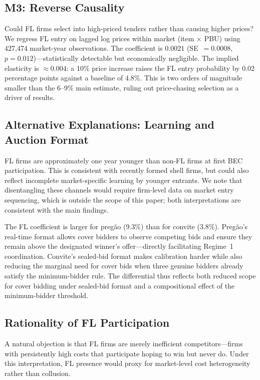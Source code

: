 \subsection{M3: Reverse Causality}

Could FL firms select into high-priced tenders rather than causing
higher prices? We regress FL entry on lagged log prices within market
(item $\times$ PBU) using 427,474 market-year observations. The
coefficient is $0.0021$ (SE~$=0.0008$, $p = 0.012$)---statistically
detectable but economically negligible. The implied elasticity is
$\approx 0.004$: a 10\% price increase raises the FL entry probability
by 0.02 percentage points against a baseline of 4.8\%. This is two
orders of magnitude smaller than the 6--9\% main estimate, ruling out
price-chasing selection as a driver of results.

\subsection{Alternative Explanations: Learning and Auction Format}

FL firms are approximately one year younger than non-FL firms at first %
BEC participation. This is consistent with recently formed shell firms,
but could also reflect incomplete market-specific learning by younger
entrants. We note that disentangling these channels would require
firm-level data on market entry sequencing, which is outside the scope
of this paper; both interpretations are consistent with the main
findings.

The FL coefficient is larger for preg\~ao (9.3\%) than for convite
(3.8\%). Preg\~ao's real-time format allows cover bidders to observe
competing bids and ensure they remain above the designated winner's
offer---directly facilitating Regime~1 coordination. Convite's
sealed-bid format makes calibration harder while also reducing the
marginal need for cover bids when three genuine bidders already satisfy
the minimum-bidder rule. The differential thus reflects both reduced
scope for cover bidding under sealed-bid format and a compositional
effect of the minimum-bidder threshold.

\subsection{Rationality of FL Participation}
\label{sec:rationality}

A natural objection is that FL firms are merely inefficient
competitors---firms with persistently high costs that participate
hoping to win but never do. Under this interpretation, FL presence
would proxy for market-level cost heterogeneity rather than
collusion.

